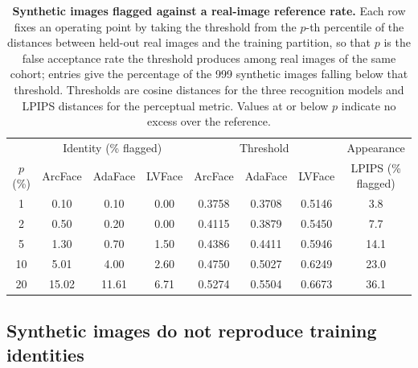 \documentclass[11pt]{article}
\begin{document}
\begin{table}[!htbp]
  \centering
  \caption{\textbf{Synthetic images flagged against a real-image reference
  rate.} Each row fixes an operating point by taking the threshold from the
  $p$-th percentile of the distances between held-out real images and the
  training partition, so that $p$ is the false acceptance rate the threshold
  produces among real images of the same cohort; entries give the percentage of
  the 999 synthetic images falling below that threshold. Thresholds are cosine
  distances for the three recognition models and LPIPS distances for the
  perceptual metric. Values at or below $p$ indicate no excess over the
  reference.}
  \label{tab:privacy-far}
  \begin{tabular}{cccccccc}
    \toprule
    & \multicolumn{3}{c}{Identity (\% flagged)} & \multicolumn{3}{c}{Threshold} & Appearance \\
    \cmidrule(lr){2-4} \cmidrule(lr){5-7} \cmidrule(lr){8-8}
    $p$ (\%) & ArcFace & AdaFace & LVFace & ArcFace & AdaFace & LVFace & LPIPS (\% flagged) \\
    \midrule
     1 &  0.10 &  0.10 & 0.00 & 0.3758 & 0.3708 & 0.5146 &  3.8 \\
     2 &  0.50 &  0.20 & 0.00 & 0.4115 & 0.3879 & 0.5450 &  7.7 \\
     5 &  1.30 &  0.70 & 1.50 & 0.4386 & 0.4411 & 0.5946 & 14.1 \\
    10 &  5.01 &  4.00 & 2.60 & 0.4750 & 0.5027 & 0.6249 & 23.0 \\
    20 & 15.02 & 11.61 & 6.71 & 0.5274 & 0.5504 & 0.6673 & 36.1 \\
    \bottomrule
  \end{tabular}
\end{table}

\subsection{Synthetic images do not reproduce training identities}

\end{document}
